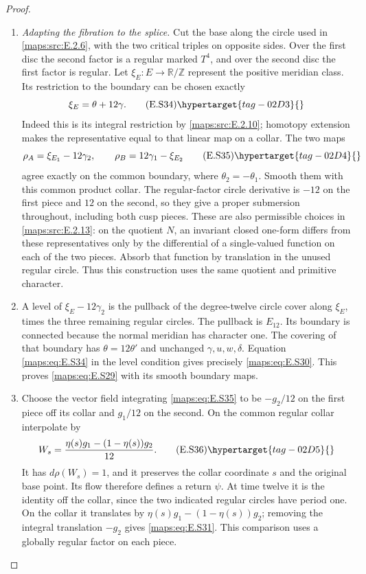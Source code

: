 \begin{proof}
\begin{enumerate}[label={$\langle1\rangle$\arabic*.},leftmargin=*]
\item \emph{Adapting the fibration to the splice.}
Cut the base along the circle used in \ref{maps:src:E.2.6}, with the two
critical triples on opposite sides. Over the first disc the
second factor is a regular marked $T^4$, and over the second
disc the first factor is regular. Let
$\xi_E:E\to\mathbb R/\mathbb Z$ represent the positive
meridian class. Its restriction to the boundary can be
chosen exactly
\[
                         \xi_E=\theta+12\gamma.
 \tag{E.S34}\hypertarget{tag-02D3}{}\label{maps:eq:E.S34}
\]
Indeed this is its integral restriction by \ref{maps:src:E.2.10}; homotopy
extension makes the representative equal to that linear
map on a collar. The two maps
\[
        \rho_A=\xi_{E_1}-12\gamma_2,
             \qquad \rho_B=12\gamma_1-\xi_{E_2}
 \tag{E.S35}\hypertarget{tag-02D4}{}\label{maps:eq:E.S35}
\]
agree exactly on the common boundary, where
$\theta_2=-\theta_1$. Smooth them with this common product
collar. The regular-factor circle derivative is $-12$ on
the first piece and $12$ on the second, so they give a
proper submersion throughout, including both cusp pieces.
These are also permissible choices in \cref{maps:src:E.2.13}: on the
quotient $N$, an invariant closed one-form differs from
these representatives only by the differential of a
single-valued function on each of the two pieces. Absorb
that function by translation in the unused regular circle.
Thus this construction uses the same quotient and
primitive character.

\item A level of $\xi_E-12\gamma_2$ is the pullback of the
degree-twelve circle cover along $\xi_E$, times the three
remaining regular circles. The pullback is $E_{12}$.
Its boundary is connected because the normal meridian has
character one. The covering of that boundary has
$\theta=12\theta'$ and unchanged $\gamma,u,w,\delta$.
Equation \eqref{maps:eq:E.S34} in the level condition gives precisely
\eqref{maps:eq:E.S30}. This proves \eqref{maps:eq:E.S29} with its smooth
boundary maps.

\item Choose the vector field integrating \eqref{maps:eq:E.S35} to be
$-g_2/12$ on the first piece off its collar and $g_1/12$
on the second. On the common regular collar interpolate by
\[
                     W_s=\frac{\eta(s)g_1-(1-\eta(s))g_2}{12}.
 \tag{E.S36}\hypertarget{tag-02D5}{}\label{maps:eq:E.S36}
\]
It has $d\rho(W_s)=1$, and it preserves the collar
coordinate $s$ and the original base point. Its flow
therefore defines a return $\psi$. At time twelve it is
the identity off the collar, since the two indicated
regular circles have period one. On the collar it
translates by $\eta(s)g_1-(1-\eta(s))g_2$; removing the
integral translation $-g_2$ gives \eqref{maps:eq:E.S31}. This comparison uses a globally regular factor on each piece.


\end{enumerate}
\end{proof}
